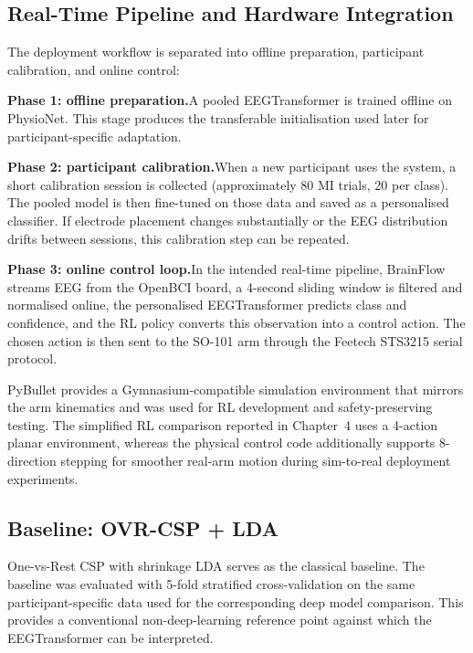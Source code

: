\documentclass[12pt, a4paper]{article}
\begin{document}
\subsection{Real-Time Pipeline and Hardware Integration}

The deployment workflow is separated into offline preparation, participant calibration, and online control:

\textbf{Phase 1: offline preparation.}\quad A pooled EEGTransformer is trained offline on PhysioNet. This stage produces the transferable initialisation used later for participant-specific adaptation.

\textbf{Phase 2: participant calibration.}\quad When a new participant uses the system, a short calibration session is collected (approximately 80 MI trials, 20 per class). The pooled model is then fine-tuned on those data and saved as a personalised classifier. If electrode placement changes substantially or the EEG distribution drifts between sessions, this calibration step can be repeated.

\textbf{Phase 3: online control loop.}\quad In the intended real-time pipeline, BrainFlow streams EEG from the OpenBCI board, a 4-second sliding window is filtered and normalised online, the personalised EEGTransformer predicts class and confidence, and the RL policy converts this observation into a control action. The chosen action is then sent to the SO-101 arm through the Feetech STS3215 serial protocol.

PyBullet provides a Gymnasium-compatible simulation environment that mirrors the arm kinematics and was used for RL development and safety-preserving testing. The simplified RL comparison reported in Chapter~4 uses a 4-action planar environment, whereas the physical control code additionally supports 8-direction stepping for smoother real-arm motion during sim-to-real deployment experiments.

\subsection{Baseline: OVR-CSP + LDA}

One-vs-Rest CSP with shrinkage LDA serves as the classical baseline. The baseline was evaluated with 5-fold stratified cross-validation on the same participant-specific data used for the corresponding deep model comparison. This provides a conventional non-deep-learning reference point against which the EEGTransformer can be interpreted.
\end{document}
